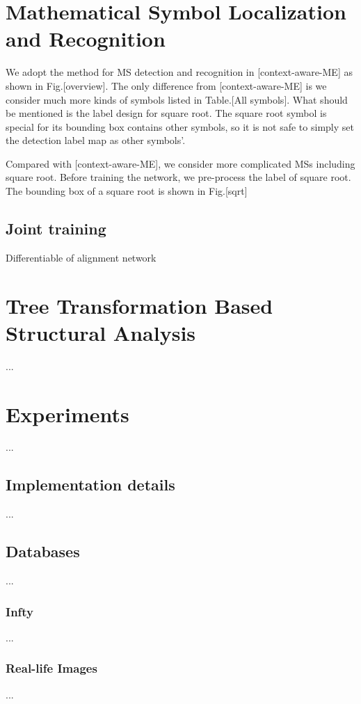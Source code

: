 \documentclass[10pt,conference,a4paper]{IEEEtran}
\begin{document}
	\section{Mathematical Symbol Localization and Recognition}
    We adopt the method for MS detection and recognition in [context-aware-ME] as shown in Fig.[overview]. The only difference from [context-aware-ME] is we consider much more kinds of symbols listed in Table.[All symbols]. What should be mentioned is the label design for square root. The square root symbol is special for its bounding box contains other symbols, so it is not safe to simply set the detection label map as other symbols'. 
    
    
    
    Compared with [context-aware-ME], we consider more complicated MSs including square root.
    Before training the network, we pre-process the label of square root. 
    The bounding box of a square root is shown in Fig.[sqrt]
    
    
    
	\subsection{Joint training}
	Differentiable of alignment network
	\section{Tree Transformation Based Structural Analysis}
	...
	\section{Experiments}
	...
	\subsection{Implementation details}
	...
	\subsection{Databases}
	...
	\subsubsection{Infty}
	...
	\subsubsection{Real-life Images}
	...
\end{document}
